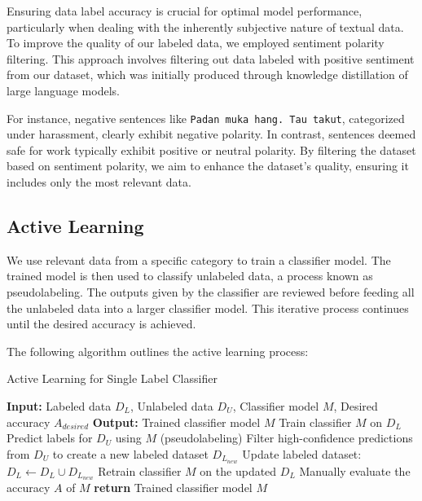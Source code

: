 \documentclass[preprint]{article}
\begin{document}
Ensuring data label accuracy is crucial for optimal model performance, particularly when dealing with the inherently subjective nature of textual data. To improve the quality of our labeled data, we employed sentiment polarity filtering. This approach involves filtering out data labeled with positive sentiment from our dataset, which was initially produced through knowledge distillation of large language models.

For instance, negative sentences like \texttt{Padan muka hang. Tau takut}, categorized under harassment, clearly exhibit negative polarity. In contrast, sentences deemed safe for work typically exhibit positive or neutral polarity. By filtering the dataset based on sentiment polarity, we aim to enhance the dataset's quality, ensuring it includes only the most relevant data.

\subsection{Active Learning}

We use relevant data from a specific category to train a classifier model. The trained model is then used to classify unlabeled data, a process known as pseudolabeling. The outputs given by the classifier are reviewed before feeding all the unlabeled data into a larger classifier model. This iterative process continues until the desired accuracy is achieved.

The following algorithm outlines the active learning process:

\begin{algorithm}[H]
  \caption{Active Learning for Single Label Classifier}
  \begin{algorithmic}[1]
  \State \textbf{Input:} Labeled data \(D_L\), Unlabeled data \(D_U\), Classifier model \(M\), Desired accuracy \(A_{desired}\)
  \State \textbf{Output:} Trained classifier model \(M\)
      \State Train classifier \(M\) on \(D_L\)
      \State Predict labels for \(D_U\) using \(M\) (pseudolabeling)
      \State Filter high-confidence predictions from \(D_U\) to create a new labeled dataset \(D_{L_{new}}\)
      \State Update labeled dataset: \(D_L \leftarrow D_L \cup D_{L_{new}}\)
      \State Retrain classifier \(M\) on the updated \(D_L\)
      \State Manually evaluate the accuracy \(A\) of \(M\)
      \EndWhile
  \State \textbf{return} Trained classifier model \(M\)
  \end{algorithmic}
  \end{algorithm}
\end{document}
